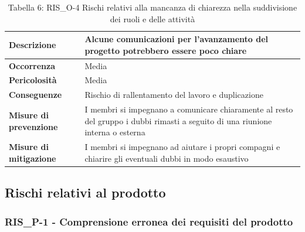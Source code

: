 \documentclass[a4paper,10pt]{article}
\begin{document}
\begin{table}[H]
\centering
\renewcommand{\arraystretch}{1.3}

\begin{tabularx}{\textwidth}{|p{4cm}|X|}
\hline
\textbf{Descrizione} & 
Alcune comunicazioni per l'avanzamento del progetto potrebbero essere poco chiare \\ \hline

\textbf{Occorrenza} & Media \\ \hline

\textbf{Pericolosità} & Media \\ \hline

\textbf{Conseguenze} & 
Rischio di rallentamento del lavoro e duplicazione \\ \hline

\textbf{Misure di prevenzione} & I membri si impegnano a comunicare chiaramente al resto del gruppo i dubbi rimasti a seguito di una riunione interna o esterna \\ \hline

\textbf{Misure di mitigazione} &
I membri si impegnano ad aiutare i propri compagni e chiarire gli eventuali dubbi in modo esaustivo \\ \hline

\end{tabularx}

\caption{Tabella 6: RIS\_O-4 Rischi relativi alla mancanza di chiarezza nella suddivisione dei ruoli e delle attività}
\end{table}


\subsection{Rischi relativi al prodotto}
\subsubsection{RIS\_P-1 - Comprensione erronea dei requisiti del prodotto}
\end{document}
